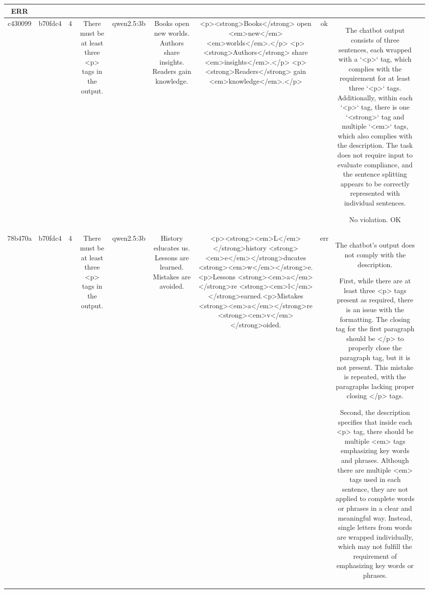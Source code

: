 \begin{table}[h!]
\begin{tabular}{|c|c|c|c|c|c|c|c|c|c|}
ERR & \\
\hline
c430099 & b70fdc4 & 4 & There must be at least three <p> tags in the output. & qwen2.5:3b & Books open new worlds. Authors share insights. Readers gain knowledge. & <p><strong>Books</strong> open <em>new</em> <em>worlds</em>.</p>
<p><strong>Authors</strong> share <em>insights</em>.</p>
<p><strong>Readers</strong> gain <em>knowledge</em>.</p> & ok & The chatbot output consists of three sentences, each wrapped with a `<p>` tag, which complies with the requirement for at least three `<p>` tags. Additionally, within each `<p>` tag, there is one `<strong>` tag and multiple `<em>` tags, which also complies with the description. The task does not require input to evaluate compliance, and the sentence splitting appears to be correctly represented with individual sentences.

No violation.
OK & \\
\hline
78b470a & b70fdc4 & 4 & There must be at least three <p> tags in the output. & qwen2.5:3b & History educates us. Lessons are learned. Mistakes are avoided. & <p><strong><em>L</em></strong>history <strong><em>e</em></strong>ducates <strong><em>w</em></strong>e.<p>Lessons <strong><em>a</em></strong>re <strong><em>l</em></strong>earned.<p>Mistakes <strong><em>a</em></strong>re <strong><em>v</em></strong>oided. & err & The chatbot's output does not comply with the description. 

First, while there are at least three <p> tags present as required, there is an issue with the formatting. The closing tag for the first paragraph should be </p> to properly close the paragraph tag, but it is not present. This mistake is repeated, with the paragraphs lacking proper closing </p> tags.

Second, the description specifies that inside each <p> tag, there should be multiple <em> tags emphasizing key words and phrases. Although there are multiple <em> tags used in each sentence, they are not applied to complete words or phrases in a clear and meaningful way. Instead, single letters from words are wrapped individually, which may not fulfill the requirement of emphasizing key words or phrases.


\end{tabular}
\end{table}
